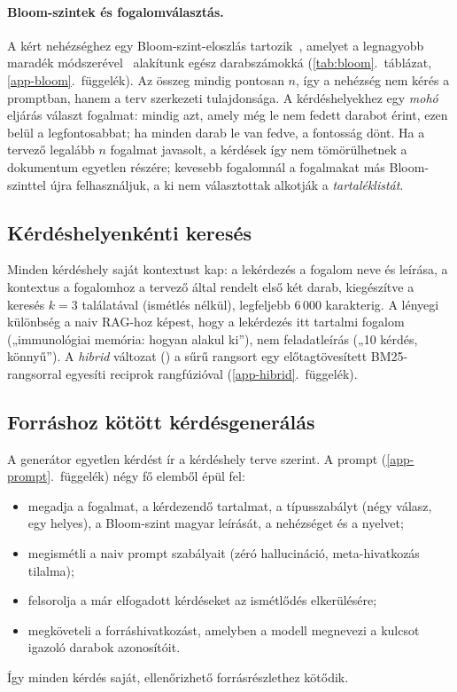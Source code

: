 \paragraph{Bloom-szintek és fogalomválasztás.} A kért nehézséghez egy Bloom-szint-eloszlás
tartozik~\cite{anderson2001bloom}, amelyet a legnagyobb maradék módszerével~\cite{balinski2001fair}
alakítunk egész darabszámokká (\ref{tab:bloom}.~táblázat, \ref{app-bloom}.~függelék). Az összeg mindig
pontosan $n$, így a nehézség nem kérés a promptban, hanem a terv szerkezeti tulajdonsága. A
kérdéshelyekhez egy \emph{mohó} eljárás választ fogalmat: mindig azt, amely még le nem fedett darabot
érint, ezen belül a legfontosabbat; ha minden darab le van fedve, a fontosság dönt. Ha a tervező legalább
$n$ fogalmat javasolt, a kérdések így nem tömörülhetnek a dokumentum egyetlen részére; kevesebb fogalomnál
a fogalmakat más Bloom-szinttel újra felhasználjuk, a ki nem választottak alkotják a
\emph{tartaléklistát}.

\subsection{Kérdéshelyenkénti keresés}
\label{sec:visszakereses}

Minden kérdéshely saját kontextust kap: a lekérdezés a fogalom neve és leírása, a kontextus a fogalomhoz
a tervező által rendelt első két darab, kiegészítve a keresés $k=3$ találatával (ismétlés nélkül),
legfeljebb 6\,000 karakterig. A lényegi különbség a naiv RAG-hoz képest, hogy a lekérdezés itt tartalmi
fogalom („immunológiai memória: hogyan alakul ki”), nem feladatleírás („10 kérdés, könnyű”). A
\emph{hibrid} változat () a sűrű rangsort egy előtagtövesített BM25-rangsorral egyesíti reciprok
rangfúzióval (\ref{app-hibrid}.~függelék).

\subsection{Forráshoz kötött kérdésgenerálás}
\label{sec:generalas}

A generátor egyetlen kérdést ír a kérdéshely terve szerint. A prompt (\ref{app-prompt}.~függelék) négy fő elemből épül fel:
\begin{itemize}[leftmargin=*,itemsep=1pt,topsep=2pt]
\item megadja a fogalmat, a kérdezendő tartalmat, a típusszabályt (négy válasz, egy helyes), a Bloom-szint magyar leírását, a nehézséget és a nyelvet;
\item megismétli a naiv prompt szabályait (zéró hallucináció, meta-hivatkozás tilalma);
\item felsorolja a már elfogadott kérdéseket az ismétlődés elkerülésére;
\item megköveteli a forráshivatkozást, amelyben a modell megnevezi a kulcsot igazoló darabok azonosítóit.
\end{itemize}
Így minden kérdés saját, ellenőrizhető forrásrészlethez kötődik.

